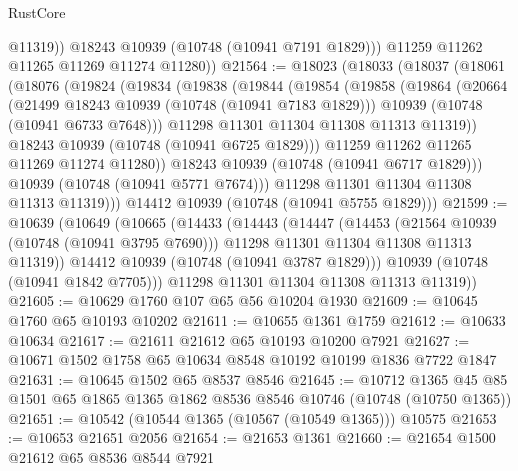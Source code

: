 \begin{lexlean}{RustCore}
\begin{coremodule}
              @11319))
          @18243
          @10939
          (@10748 (@10941 @7191 @1829)))
        @11259
        @11262
        @11265
        @11269
        @11274
        @11280))
@21564 := @18023
    (@18033
      (@18037
        (@18061
          (@18076
            (@19824
              (@19834
                (@19838
                  (@19844
                    (@19854
                      (@19858
                        (@19864
                          (@20664
                            (@21499 @18243 @10939 (@10748 (@10941 @7183 @1829)))
                            @10939
                            (@10748 (@10941 @6733 @7648)))
                          @11298
                          @11301
                          @11304
                          @11308
                          @11313
                          @11319))
                      @18243
                      @10939
                      (@10748 (@10941 @6725 @1829)))
                    @11259
                    @11262
                    @11265
                    @11269
                    @11274
                    @11280))
                @18243
                @10939
                (@10748 (@10941 @6717 @1829)))
              @10939
              (@10748 (@10941 @5771 @7674)))
            @11298
            @11301
            @11304
            @11308
            @11313
            @11319)))
      @14412
      @10939
      (@10748 (@10941 @5755 @1829)))
@21599 := @10639
    (@10649
      (@10665
        (@14433
          (@14443
            (@14447
              (@14453
                (@21564 @10939 (@10748 (@10941 @3795 @7690)))
                @11298
                @11301
                @11304
                @11308
                @11313
                @11319))
            @14412
            @10939
            (@10748 (@10941 @3787 @1829)))
          @10939
          (@10748 (@10941 @1842 @7705)))
        @11298
        @11301
        @11304
        @11308
        @11313
        @11319))
@21605 := @10629 @1760 @107 @65 @56 @10204 @1930
@21609 := @10645 @1760 @65 @10193 @10202
@21611 := @10655 @1361 @1759
@21612 := @10633 @10634
@21617 := @21611 @21612 @65 @10193 @10200 @7921
@21627 := @10671 @1502 @1758 @65 @10634 @8548 @10192 @10199 @1836 @7722 @1847
@21631 := @10645 @1502 @65 @8537 @8546
@21645 := @10712
    @1365
    @45
    @85
    @1501
    @65
    @1865
    @1365
    @1862
    @8536
    @8546
    @10746
    (@10748 (@10750 @1365))
@21651 := @10542 (@10544 @1365 (@10567 (@10549 @1365))) @10575
@21653 := @10653 @21651 @2056
@21654 := @21653 @1361
@21660 := @21654 @1500 @21612 @65 @8536 @8544 @7921

\end{coremodule}
\end{lexlean}
